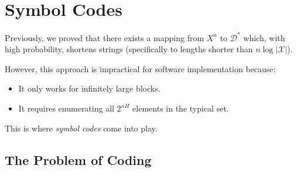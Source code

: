 \chapter{Symbol Codes}


Previously, we proved that there exists a mapping from \( X^n \) to \( \mathcal{D}^* \) which, with high probability, shortens strings (specifically to lengths shorter than \( n \log |\mathcal{X}| \)).\bigskip

However, this approach is impractical for software implementation because:
\begin{itemize}
    \item It only works for infinitely large blocks.
    \item It requires enumerating all \( 2^{nH} \) elements in the typical set.
\end{itemize}

This is where \textit{symbol codes} come into play.

\section{The Problem of Coding}





